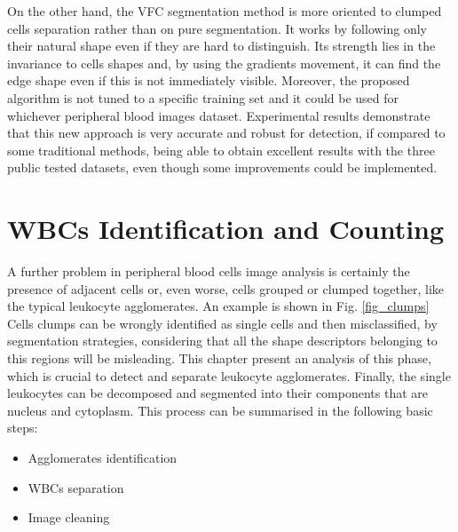 \documentclass[final,a4paper,12pt,english]{UnicaPhdThesis3}
\begin{document}
On the other hand, the VFC segmentation method is more oriented to clumped cells separation rather than on pure segmentation. It works by following only their natural shape even if they are hard to distinguish. Its strength lies in the invariance to cells shapes and, by using the gradients movement, it can find the edge shape even if this is not immediately visible.
Moreover, the proposed algorithm is not tuned to a specific training set and it could be used for whichever peripheral blood images dataset. 
Experimental results demonstrate that this new approach is very accurate and robust for detection, if compared to some traditional methods, being able to obtain excellent results with the three public tested datasets, even though some improvements could be implemented.

\chapter{WBCs Identification and Counting} 
A further problem in peripheral blood cells image analysis is certainly the presence of adjacent cells or, even worse, cells grouped or clumped together, like the typical leukocyte agglomerates. An example is shown in Fig. \ref{fig_clumps} Cells clumps can be wrongly identified as single cells and then misclassified, by segmentation strategies, considering that all the shape descriptors belonging to this regions will be misleading. 
This chapter present an analysis of this phase, which is crucial to detect and separate leukocyte agglomerates. Finally, the single leukocytes can be decomposed and segmented into their components that are nucleus and cytoplasm. This process can be summarised in the following basic steps:
\begin{itemize}
\item Agglomerates identification 
\item WBCs separation
\item Image cleaning
\end{itemize}
\end{document}

